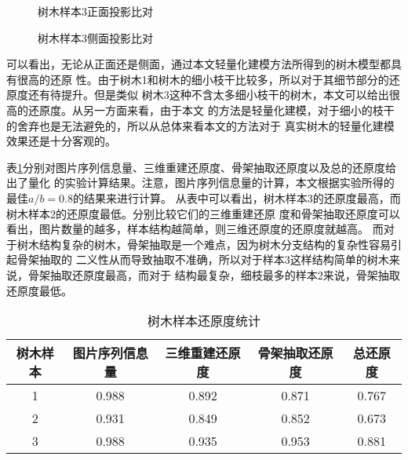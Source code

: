 \begin{figure}
	\centering
	\hspace{3em}
	\hspace{3em}
	\hspace{3em}
	\hspace{3em}
	\caption{树木样本3正面投影比对}
	\label{fig:s3proj1}
\end{figure}
\begin{figure}
	\centering
	\hspace{3em}
	\hspace{3em}
	\hspace{3em}
	\hspace{3em}
	\caption{树木样本3侧面投影比对}
	\label{fig:s3proj2}
\end{figure}

可以看出，无论从正面还是侧面，通过本文轻量化建模方法所得到的树木模型都具有很高的还原
性。由于树木1和树木的细小枝干比较多，所以对于其细节部分的还原度还有待提升。但是类似
树木3这种不含太多细小枝干的树木，本文可以给出很高的还原度。从另一方面来看，由于本文
的方法是轻量化建模，对于细小的枝干的舍弃也是无法避免的，所以从总体来看本文的方法对于
真实树木的轻量化建模效果还是十分客观的。

表\ref{tab:restore}分别对图片序列信息量、三维重建还原度、骨架抽取还原度以及总的还原度给出了量化
的实验计算结果。注意，图片序列信息量的计算，本文根据实验所得的最佳$a/b=0.8$的结果来进行计算。
从表中可以看出，树木样本3的还原度最高，而树木样本2的还原度最低。分别比较它们的三维重建还原
度和骨架抽取还原度可以看出，图片数量的越多，样本结构越简单，则三维还原度的还原度就越高。
而对于树木结构复杂的树木，骨架抽取是一个难点，因为树木分支结构的复杂性容易引起骨架抽取的
二义性从而导致抽取不准确，所以对于样本3这样结构简单的树木来说，骨架抽取还原度最高，而对于
结构最复杂，细枝最多的样本2来说，骨架抽取还原度最低。
\\
\begin{table}[H]
	\caption{树木样本还原度统计}
	\centering
\begin{tabular}{c|cccc} \label{tab:restore}
	树木样本& 图片序列信息量 & 三维重建还原度 & 骨架抽取还原度 & 总还原度\\
	\hline
	1		& 0.988			 & 0.892		  & 0.871		   & 0.767\\
	2		& 0.931			 & 0.849		  & 0.852		   & 0.673\\
	3		& 0.988			 & 0.935		  & 0.953		   & 0.881\\
\end{tabular}
\end{table}

